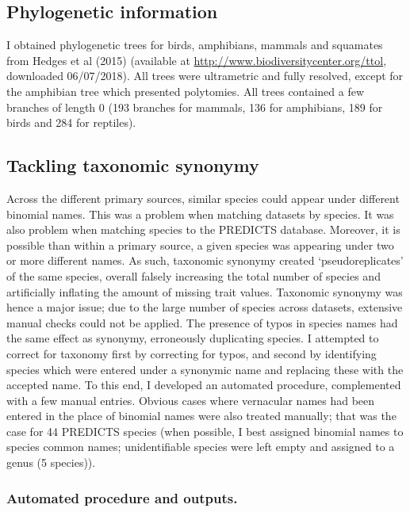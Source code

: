 \subsection{Phylogenetic information}
I obtained phylogenetic trees for birds, amphibians, mammals and squamates from Hedges et al (2015) (available at \url{http://www.biodiversitycenter.org/ttol}, downloaded 06/07/2018). All trees were ultrametric and fully resolved, except for the amphibian tree which presented polytomies. All trees contained a few branches of length 0 (193 branches for mammals, 136 for amphibians, 189 for birds and 284 for reptiles).

\subsection{Tackling taxonomic synonymy}
Across the different primary sources, similar species could appear under different binomial names. This was a problem when matching datasets by species. It was also problem when matching species to the PREDICTS database. Moreover, it is possible than within a primary source, a given species was appearing under two or more different names. As such, taxonomic synonymy created `pseudoreplicates' of the same species, overall falsely increasing the total number of species and artificially inflating the amount of missing trait values. Taxonomic synonymy was hence a major issue; due to the large number of species across datasets, extensive manual checks could not be applied. The presence of typos in species names had the same effect as synonymy, erroneously duplicating species. I attempted to correct for taxonomy first by correcting for typos, and second by identifying species which were entered under a synonymic name and replacing these with the accepted name. To this end, I developed an automated procedure, complemented with a few manual entries. Obvious cases where vernacular names had been entered in the place of binomial names were also treated manually; that was the case for 44 PREDICTS species (when possible, I best assigned binomial names to species common names; unidentifiable species were left empty and assigned to a genus (5 species)).

\subsubsection{Automated procedure and outputs.}

